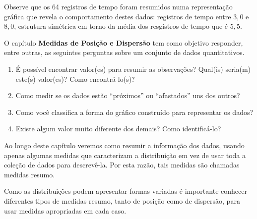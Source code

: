 Observe que os 64 registros de tempo foram resumidos numa representação gráfica que revela o comportamento destes dados: registros de tempo entre $3{,}0$ e $8{,}0$, estrutura simétrica em torno da média dos resgistros de tempo que é $5{,}5$.

O capítulo \textbf{Medidas de Posição e Dispersão} tem como objetivo responder, entre outras, as seguintes perguntas sobre um conjunto de dados quantitativos.
\begin{enumerate}
\item {} 
É possível encontrar valor(es) para resumir as observações? Qual(is) seria(m) este(s) valor(es)? Como encontrá-lo(s)?

\item {} 
Como medir se os dados estão “próximos” ou “afastados” uns dos outros?

\item {} 
Como você classifica a forma do gráfico construído para representar os dados?

\item {} 
Existe algum valor muito diferente dos demais? Como identificá-lo?

\end{enumerate}

Ao longo deste capítulo veremos como resumir a informação dos dados, usando apenas algumas medidas que caracterizam a distribuição em vez de usar toda a coleção de dados para descrevê-la. Por esta razão, tais medidas são chamadas medidas resumo.

Como as distribuições podem apresentar formas variadas é importante conhecer diferentes tipos de medidas resumo, tanto de posição como de dispersão, para usar medidas apropriadas em cada caso.

\clearpage

